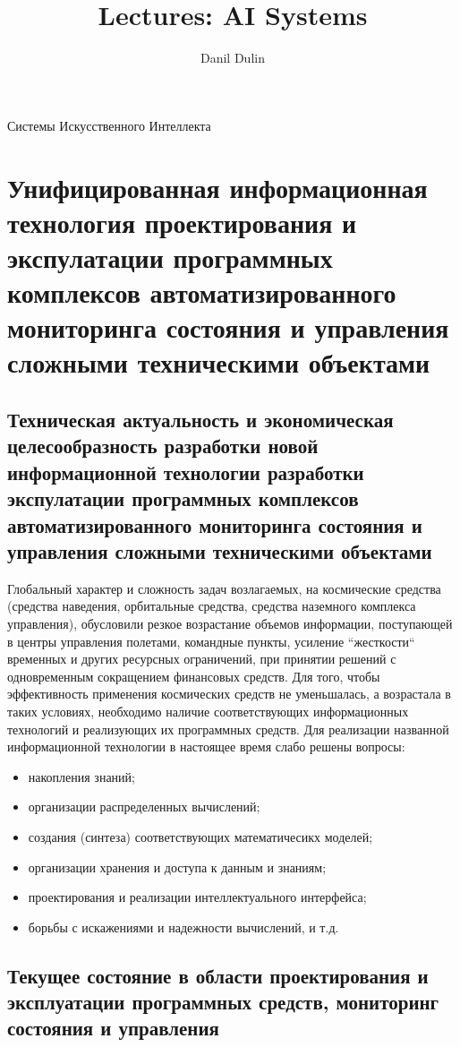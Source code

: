 \documentclass[a4paper,12pt]{report}
\begin{document}
\author{Danil Dulin}
\title{Lectures: AI Systems}

{\huge{Системы Искусственного Интеллекта}}

\tableofcontents

\newpage


\chapter{Унифицированная информационная технология проектирования и
	экспулатации программных комплексов автоматизированного мониторинга
	состояния и управления сложными техническими объектами}


\section{Техническая актуальность и экономическая целесообразность
	разработки новой информационной технологии разработки экспулатации
	программных комплексов автоматизированного мониторинга состояния и
	управления сложными техническими объектами}

	Глобальный характер и сложность задач возлагаемых, на космические средства
	(средства наведения, орбитальные средства, средства наземного комплекса
	управления), обусловили резкое возрастание объемов информации, поступающей
	в центры управления полетами, командные пункты, усиление ``жесткости``
	 временных и других ресурсных ограничений, при принятии решений с
	одновременным сокращением финансовых средств. Для того, чтобы эффективность
	применения космических средств не уменьшалась, а возрастала в таких
	условиях, необходимо наличие соответствующих информационных технологий
	и реализующих их программных средств. Для реализации названной
	информационной технологии в настоящее время слабо решены вопросы:
	\begin{itemize}
		\item накопления знаний;
		\item организации распределенных вычислений;
		\item создания (синтеза) соответствующих математичесикх моделей;
		\item организации хранения и доступа к данным и знаниям;
		\item проектирования и реализации интеллектуального интерфейса;
		\item борьбы с искажениями и надежности вычислений, и т.д.
	\end{itemize}


\section{Текущее состояние в области проектирования и эксплуатации
	программных средств, мониторинг состояния и управления}
\end{document}
